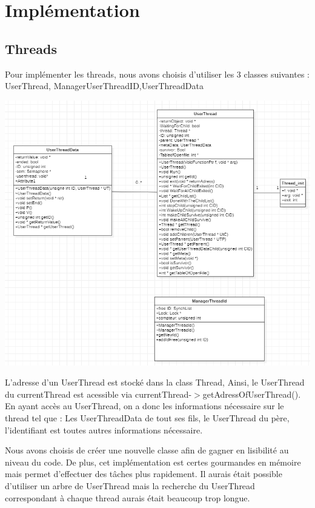 \documentclass{article}
\begin{document}
\newpage

\section{Implémentation}

\vspace{5mm}

\subsection{Threads}




Pour implémenter les threads, nous avons choisis d'utiliser les 3 classes suivantes : UserThread, ManagerUserThreadID,UserThreadData

\includegraphics[scale=0.7]{code/userprog/UserThread.PNG}

L'adresse d'un UserThread est stocké dans la class Thread, Ainsi, le UserThread du currentThread est acessible via currentThread-$>$getAdressOfUserThread(). En ayant accès au UserThread, on a donc les informations nécessaire sur le thread tel que : Les UserThreadData de tout ses fils, le UserThread du père, l'identifiant est toutes autres informations nécessaire.
	
\vspace{5mm} 

Nous avons choisis de créer une nouvelle classe afin de gagner en lisibilité au niveau du code. De plus, cet implémentation est certes gourmandes en mémoire mais permet d'effectuer des tâches plus rapidement. Il aurais était possible d'utiliser un arbre de UserThread mais la recherche du UserThread correspondant à chaque thread aurais était beaucoup trop longue.
\end{document}
